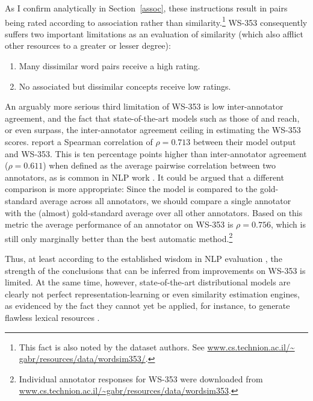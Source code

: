 \noindent 

As I confirm analytically in Section~\ref{assoc}, these instructions result in pairs being rated according to association rather than similarity.\footnote{This fact is also noted by the dataset authors. See \url{www.cs.technion.ac.il/~ gabr/resources/data/wordsim353/}.} WS-353 consequently suffers two important limitations as an evaluation of similarity (which also afflict other resources to a greater or lesser degree):  

\begin{enumerate}

\item Many dissimilar word pairs receive a high rating. 

\item No associated but dissimilar concepts receive low ratings. 

\end{enumerate}

An arguably more serious third limitation of WS-353 is low inter-annotator agreement, and the fact that state-of-the-art models such as those of \cite{collobert2008unified} and \cite{huang2012improving} reach, or even surpass, the inter-annotator agreement ceiling in estimating the WS-353 scores. \cite{huang2012improving} report a Spearman correlation of \(\rho = 0.713\) between their model output and WS-353. This is ten percentage points higher than inter-annotator agreement (\(\rho = 0.611\)) when defined as the average pairwise correlation between two annotators, as is common in NLP work \citep{pado2007flexible,reisinger2010mixture,silberer2014learning}. It could be argued that a different comparison is more appropriate: Since the model is compared to the gold-standard average across all annotators, we should compare a single annotator with the (almost) gold-standard average over all other annotators. Based on this metric the average performance of an annotator on WS-353 is  \( \rho=0.756 \), which is still only marginally better than the best automatic method.\footnote{Individual annotator responses for WS-353 were downloaded from \url{www.cs.technion.ac.il/~gabr/resources/data/wordsim353}.}  

Thus, at least according to the established wisdom in NLP evaluation \citep{yong1999case,cunningham2005information,resnik201011}, the strength of the conclusions that can be inferred from improvements on WS-353 is limited. At the same time, however, state-of-the-art distributional models are clearly not perfect representation-learning or even similarity estimation engines, as evidenced by the fact they cannot yet be applied, for instance, to generate flawless lexical resources \citep{alfonseca2002extending}. 

